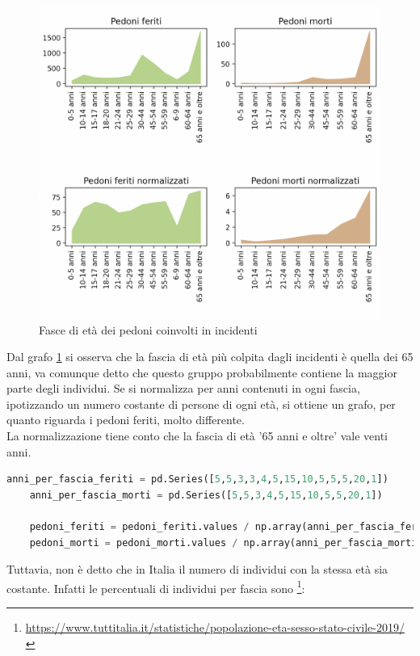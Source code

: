 \documentclass[a4paper]{report}
\begin{document}
\begin{figure}
    \includegraphics[width=\linewidth]{../src/incidenti/incidenti_senza_coords/pedoni/eta_pedoni.png}
    \caption{Fasce di età dei pedoni coinvolti in incidenti}
    \label{fig:eta-pedoni}
\end{figure}

Dal grafo \ref{fig:eta-pedoni} si osserva che la fascia di età più colpita dagli 
incidenti è quella dei 65 anni, va comunque detto che questo gruppo probabilmente 
contiene la maggior parte degli individui.
Se si normalizza per anni contenuti in ogni fascia, ipotizzando un numero
costante di persone di ogni età, si ottiene un grafo, per quanto riguarda i pedoni 
feriti, molto differente. \\
La normalizzazione tiene conto che la fascia di età '65 anni e oltre' vale venti anni.

\begin{lstlisting}[language=Python]
    anni_per_fascia_feriti = pd.Series([5,5,3,3,4,5,15,10,5,5,5,20,1])
    anni_per_fascia_morti = pd.Series([5,5,3,4,5,15,10,5,5,20,1])
    
    pedoni_feriti = pedoni_feriti.values / np.array(anni_per_fascia_feriti)
    pedoni_morti = pedoni_morti.values / np.array(anni_per_fascia_morti)
\end{lstlisting}

Tuttavia, non è detto che in Italia il numero di individui con la stessa età sia costante.
Infatti le percentuali di individui per fascia sono
\footnote{\url{https://www.tuttitalia.it/statistiche/popolazione-eta-sesso-stato-civile-2019/}}: 
\end{document}
